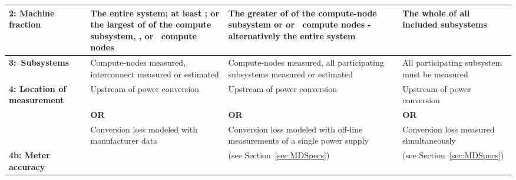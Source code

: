 \begin{table}
\begin{tabular}{|p{2.5cm}|p{3.5cm}|p{3.5cm}|p{3.5cm}|}







\textbf{2: Machine \newline fraction}  &
The entire system; at least \SpecPowerMaxLOne{}; or the largest of \SpecFracMinLOne{} of the compute subsystem, \SpecPowerMinLOne{}, or \SpecMinNodes{}~compute nodes &
The greater of \SpecFracMinLTwo{} of the compute-node subsystem or \SpecPowerMinLTwo{} or \SpecMinNodes{}~compute nodes - alternatively the entire system &
The whole of all included subsystems \\
\hline

\textbf{3:~Subsystems} &
Compute-nodes measured, interconnect measured or estimated &
Compute-nodes measured, all participating subsystems measured or estimated &
All participating subsystem must be measured \\
\hline

\textbf{4: Location of measurement} &
Upstream of power conversion &
Upstream of power conversion &
Upstream of power conversion\\

 &
\centering \textbf{OR} &
\centering \textbf{OR} &
\centering \textbf{OR} \tabularnewline

 &
Conversion loss modeled with manufacturer data &
Conversion loss modeled with off-line measurements of a single power supply &
Conversion loss measured simultaneously \\
\hline
\textbf{4b: Meter accuracy} &
\SpecAccuracyLOne{} &
\SpecAccuracyLTwo{} (see Section~\ref{sec:MDSpecs})&
\SpecAccuracyLThree{} (see Section~\ref{sec:MDSpecs})\\
\hline
\end{tabular}
\end{table}

